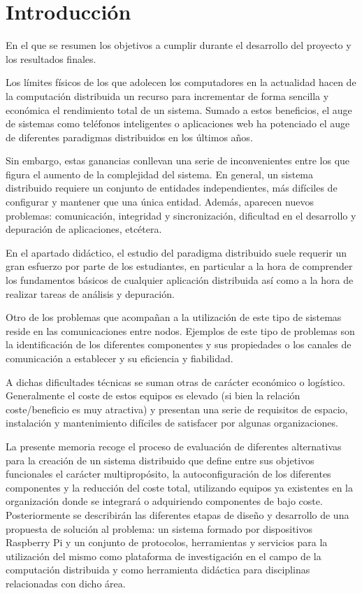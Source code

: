 \chapter{Introducción}

\begin{cabstract}
En el que se resumen los objetivos a cumplir durante el desarrollo del proyecto y los resultados finales.
\end{cabstract}

Los límites físicos de los que adolecen los computadores en la actualidad \cite{seth:physical} hacen de la computación distribuida un recurso para incrementar de forma sencilla y económica el rendimiento total de un sistema. Sumado a estos beneficios, el auge de sistemas como teléfonos inteligentes o aplicaciones web ha potenciado el auge de diferentes paradigmas distribuidos en los últimos años. 

Sin embargo, estas ganancias conllevan una serie de inconvenientes entre los que figura el aumento de la complejidad del sistema. En general, un sistema distribuido requiere un conjunto de entidades independientes, más difíciles de configurar y mantener que una única entidad. Además, aparecen nuevos problemas: comunicación, integridad y sincronización, dificultad en el desarrollo y depuración de aplicaciones, etcétera.

En el apartado didáctico, el estudio del paradigma distribuido suele requerir un gran esfuerzo por parte de los estudiantes, en particular a la hora de comprender los fundamentos básicos de cualquier aplicación distribuida así como a la hora de realizar tareas de análisis y depuración.

Otro de los problemas que acompañan a la utilización de este tipo de sistemas reside en las comunicaciones entre nodos. Ejemplos de este tipo de problemas son la identificación de los diferentes componentes y sus propiedades o los canales de comunicación a establecer y su eficiencia y fiabilidad.

A dichas dificultades técnicas se suman otras de carácter económico o logístico. Generalmente el coste de estos equipos es elevado (si bien la relación coste/beneficio es muy atractiva) y presentan una serie de requisitos de espacio, instalación y mantenimiento difíciles de satisfacer por algunas organizaciones.

La presente memoria recoge el proceso de evaluación de diferentes alternativas para la creación de un sistema distribuido que define entre sus objetivos funcionales el carácter multipropósito, la autoconfiguración de los diferentes componentes y la reducción del coste total, utilizando equipos ya existentes en la organización donde se integrará o adquiriendo componentes de bajo coste. Posteriormente se describirán las diferentes etapas de diseño y desarrollo de una propuesta de solución al problema: un sistema formado por dispositivos Raspberry Pi y un conjunto de protocolos, herramientas y servicios para la utilización del mismo como plataforma de investigación en el campo de la computación distribuida y como herramienta didáctica para disciplinas relacionadas con dicho área.

